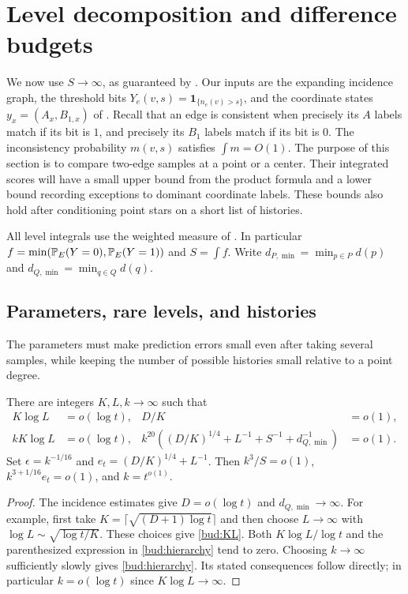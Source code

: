 \section{Level decomposition and difference budgets}\label{sec:budgets}

We now use $S\to\infty$, as guaranteed by
.  Our inputs are the expanding incidence graph, the
threshold bits $Y_e(v,s)=\mathbf1_{\{n_e(v)>s\}}$, and the coordinate
states $y_x=(A_x,B_{1,x})$ of .  Recall that an edge is
consistent when precisely its $A$ labels match if its bit is $1$, and
precisely its $B_1$ labels match if its bit is $0$.  The inconsistency
probability $m(v,s)$ satisfies $\int m=O(1)$.
The purpose of this section is to compare two-edge samples at a point or
a center.  Their integrated scores will have a small upper bound from
the product formula and a lower bound recording exceptions to dominant
coordinate labels.  These bounds also hold after conditioning point
stars on a short list of histories.

All level integrals use the weighted measure of .
In particular $f=\min(\mathbb P_E(Y=0),\mathbb P_E(Y=1))$ and $S=\int f$.
Write $d_{P,\min}=\min_{p\in P}d(p)$ and
$d_{Q,\min}=\min_{q\in Q}d(q)$.

\subsection{Parameters, rare levels, and histories}

The parameters must make prediction errors small even after taking
several samples, while keeping the number of possible histories small
relative to a point degree.

\begin{lemma}\label{bud:parameters}
There are integers $K,L,k\to\infty$ such that
\begin{align}
 K\log L&=o(\log t),& D/K&=o(1),\label{bud:KL}\\
 kK\log L&=o(\log t),&
 k^{20}\left((D/K)^{1/4}+L^{-1}+S^{-1}+d_{Q,\min}^{-1}\right)&=o(1).
 \label{bud:hierarchy}
\end{align}
Set $\epsilon=k^{-1/16}$ and
$e_t=(D/K)^{1/4}+L^{-1}$.  Then
$k^3/S=o(1)$, $k^{3+1/16}e_t=o(1)$, and $k=t^{o(1)}$.
\end{lemma}

\begin{proof}
The incidence estimates give $D=o(\log t)$ and $d_{Q,\min}\to\infty$.
For example, first take
$K=\lceil\sqrt{(D+1)\log t}\rceil$ and then choose $L\to\infty$
with $\log L\sim\sqrt{\log t/K}$.  These choices give \eqref{bud:KL}.
Both $K\log L/\log t$ and the parenthesized expression in
\eqref{bud:hierarchy} tend to zero.  Choosing $k\to\infty$ sufficiently
slowly gives \eqref{bud:hierarchy}.  Its stated consequences follow
directly; in particular $k=o(\log t)$ since $K\log L\to\infty$.
\end{proof}

